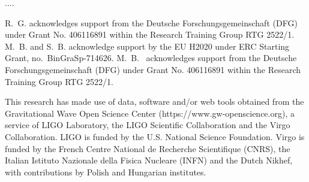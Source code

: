 \documentclass[twocolumn,showpacs,preprintnumbers,nofootinbib,prd,
superscriptaddress,10pt]{revtex4-1}
\begin{document}
        \begin{acknowledgments}
          ....
          
          R.~G. acknowledges support from the Deutsche Forschungsgemeinschaft
          (DFG) under Grant No. 406116891 within the Research Training Group
          RTG 2522/1. 
          M.~B. and S.~B. acknowledge support by the EU H2020 under ERC Starting
          Grant, no.~BinGraSp-714626.  
          M.~B.~ acknowledges support from the Deutsche Forschungsgemeinschaft
          (DFG) under Grant No. 406116891 within the Research Training Group
          RTG 2522/1. 
          
          This research has made use of data, software and/or web tools obtained 
          from the Gravitational Wave Open Science Center (https://www.gw-openscience.org), 
          a service of LIGO Laboratory, the LIGO Scientific Collaboration and the 
          Virgo Collaboration. LIGO is funded by the U.S. National Science Foundation. 
          Virgo is funded by the French Centre National de Recherche Scientifique (CNRS), 
          the Italian Istituto Nazionale della Fisica Nucleare (INFN) and the 
          Dutch Nikhef, with contributions by Polish and Hungarian institutes.
        \end{acknowledgments}

        


        
        
	
	
\end{document}
